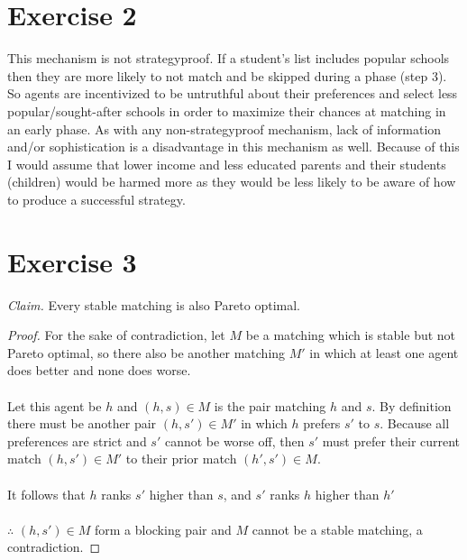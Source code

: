 \documentclass{article}
\begin{document}
\section*{Exercise 2}
This mechanism is not strategyproof. If a student's list includes popular schools then they are more likely to not match and be skipped during a phase (step 3). So agents are incentivized to be untruthful about their preferences and select less popular/sought-after schools in order to maximize their chances at matching in an early phase. As with any non-strategyproof mechanism, lack of information and/or sophistication is a disadvantage in this mechanism as well. Because of this I would assume that lower income and less educated parents and their students (children) would be harmed more as they would be less likely to be aware of how to produce a successful strategy.

\section*{Exercise 3}
\textit{Claim.} Every stable matching is also Pareto optimal.
\begin{proof}
For the sake of contradiction, let $M$ be a matching which is stable but not Pareto optimal, so there also be another matching $M'$ in which at least one agent does better and none does worse.\\ \\
Let this agent be $h$ and $(h, s) \in M$ is the pair matching $h$ and $s$. By definition there must be another pair $(h, s') \in M'$ in which $h$ prefers $s'$ to $s$. Because all preferences are strict and $s'$ cannot be worse off, then $s'$ must prefer their current match $(h, s') \in M'$ to their prior match $(h', s') \in M$.\\ \\
It follows that $h$ ranks $s'$ higher than $s$, and $s'$ ranks $h$ higher than $h'$\\ \\
$\therefore$ $(h, s') \in M$ form a blocking pair and $M$ cannot be a stable matching, a contradiction.
\end{proof}
\end{document}
